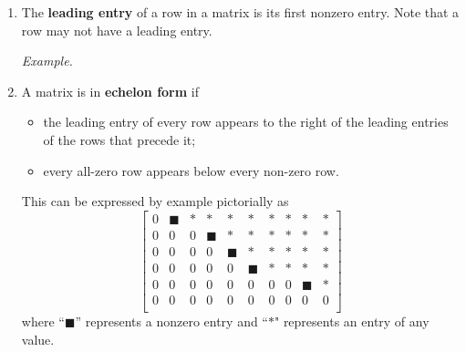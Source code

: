 \begin{enumerate}
  \textit{Facts.}
  \begin{itemize}
  \item
    \textit{Row equivalence is, in fact, an equivalence.}
    \begin{itemize}
    \item (reflexivity) $A \sim A$ for any matrix $A$;
    \item (symmetry) $A \sim B$ if and only if $B \sim A$;
    \item (transitivity) If $A \sim B$ and $B \sim C$ then $A \sim C$.
    \end{itemize}
  \item
    \textit{Row operations preserve solutions.}  Suppose $A$ and $B$
    are the augmented matrices of two linear systems.  If $A \sim B$
    then $\vs \in \R^n$ is a solution of the linear system with
    augmented matrix $A$ if and only if it is a solution of the system
    with augmented matrix $B$.
  \end{itemize}

  \textit{Example.}
\item
  The \textbf{leading entry} of a row in a matrix is its first nonzero
  entry.  Note that a row may not have a leading entry.

  \textit{Example.}
\item
  A matrix is in \textbf{echelon form} if
  \begin{itemize}
  \item
    the leading entry of every row appears to the right of the
    leading entries of the rows that precede it;
  \item
    every all-zero row appears below every non-zero row.
  \end{itemize}
  This can be expressed by example pictorially as
  \begin{displaymath}
    \begin{bmatrix}
      0&\blacksquare&*&*&*&*&*&*&*&*\\
      0&0&0&\blacksquare&*&*&*&*&*&*\\
      0&0&0&0&\blacksquare&*&*&*&*&*\\
      0&0&0&0&0&\blacksquare&*&*&*&*\\
      0&0&0&0&0&0&0&0&\blacksquare&*\\
      0&0&0&0&0&0&0&0&0&0\\
    \end{bmatrix}
  \end{displaymath}
  where ``$\blacksquare$'' represents a nonzero entry and ``$*$" represents
  an entry of any value.


\end{enumerate}
